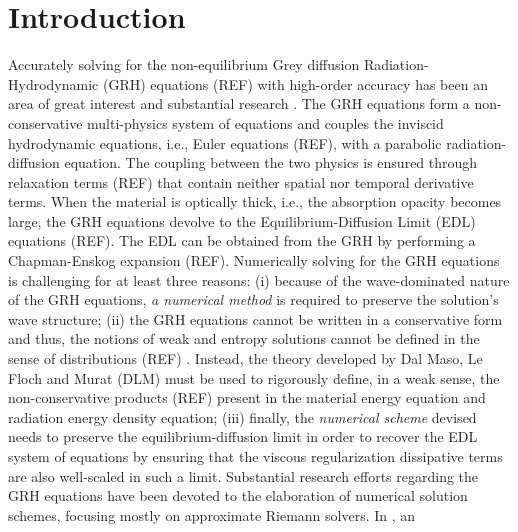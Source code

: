 \documentclass[times,doublespace]{fldauth}%
\begin{document}
\section{Introduction}
\label{sec:intro}
%
Accurately solving for the non-equilibrium Grey diffusion Radiation-Hydrodynamic (GRH) equations (REF) with 
high-order accuracy has been an area of great interest and substantial research 
. 
The GRH equations form a non-conservative multi-physics system of equations and couples the inviscid 
hydrodynamic equations, i.e., Euler equations (REF), with a parabolic 
radiation-diffusion equation. The coupling between the two physics is ensured through relaxation terms (REF) 
that contain neither spatial nor temporal derivative terms. When the material is optically thick, i.e., 
the absorption opacity becomes large, the GRH equations devolve to the Equilibrium-Diffusion Limit (EDL) 
equations (REF). The EDL can be obtained from the GRH by performing a Chapman-Enskog expansion (REF).
Numerically solving for the GRH equations is challenging for at least three reasons: (i) because of the 
wave-dominated nature of the GRH equations, \emph{a numerical method} is required to preserve the 
solution's wave structure; 
(ii) the GRH equations cannot be written in a conservative form and thus, the notions of weak and entropy 
solutions cannot be defined in the sense of distributions (REF) . Instead, the theory developed by Dal Maso, Le Floch and Murat (DLM) must be used to
rigorously define, in a weak sense, the non-conservative products (REF) present in the material energy equation 
and radiation energy density equation;
(iii) finally, the \emph{numerical scheme} devised needs to preserve the equilibrium-diffusion limit in order to recover the EDL system of equations by ensuring that the viscous regularization dissipative terms are also
well-scaled in such a limit.
%
Substantial research efforts regarding the GRH equations have been devoted to the elaboration of 
numerical solution schemes, focusing mostly on approximate Riemann solvers. In \cite{Balsara}, an 
\end{document}
